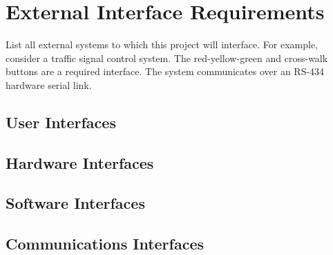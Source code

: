 \section{External Interface Requirements}
 List all external systems to which this project will interface.  For example,
 consider a traffic signal control system.  The red-yellow-green and cross-walk
 buttons are a required interface.  The system communicates over an RS-434
 hardware serial link.  

\subsection{User Interfaces}
\subsection{Hardware Interfaces}
\subsection{Software Interfaces}
\subsection{Communications Interfaces}
